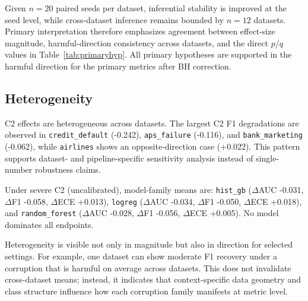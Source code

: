 \documentclass{AuthorGuide/ijitcs}
\newcommand{\fittableinput}[1]{%
\begingroup
\setlength{\tabcolsep}{4pt}%
\resizebox{\textwidth}{!}{}%
\endgroup
}
\begin{document}
Given $n=20$ paired seeds per dataset, inferential stability is improved at the seed level, while cross-dataset inference remains bounded by $n=12$ datasets. Primary interpretation therefore emphasizes agreement between effect-size magnitude, harmful-direction consistency across datasets, and the direct $p$/$q$ values in Table~\ref{tab:primaryhyp}. All primary hypotheses are supported in the harmful direction for the primary metrics after BH correction.

\begin{table}[!t]
\caption{Direct predefined-hypothesis inference table (\texttt{../results/tables/table\_primary\_hypothesis\_tests.csv}). Each row is one predefined primary hypothesis (C2/C2+C4 $\times$ AUC/F1/ECE). Deltas are dataset-level severe-minus-baseline effects; two-sided one-sample $t$ and Wilcoxon tests are reported with BH correction across the six tests. Harmful direction is $\Delta$AUC/$\Delta$F1 $< 0$ and $\Delta$ECE $> 0$; inference is dataset-cluster-aware by construction.\label{tab:primaryhyp}}
\scriptsize
\fittableinput{../results/tables/table_primary_hypothesis_tests.tex}
\end{table}


\subsection{Heterogeneity}
C2 effects are heterogeneous across datasets. The largest C2 F1 degradations are observed in \texttt{credit\_default} (-0.242), \texttt{aps\_failure} (-0.116), and \texttt{bank\_marketing} (-0.062), while \texttt{airlines} shows an opposite-direction case (+0.022). This pattern supports dataset- and pipeline-specific sensitivity analysis instead of single-number robustness claims.

Under severe C2 (uncalibrated), model-family means are: \texttt{hist\_gb} ($\Delta$AUC -0.031, $\Delta$F1 -0.058, $\Delta$ECE +0.013), \texttt{logreg} ($\Delta$AUC -0.034, $\Delta$F1 -0.050, $\Delta$ECE +0.018), and \texttt{random\_forest} ($\Delta$AUC -0.028, $\Delta$F1 -0.056, $\Delta$ECE +0.005). No model dominates all endpoints.

Heterogeneity is visible not only in magnitude but also in direction for selected settings. For example, one dataset can show moderate F1 recovery under a corruption that is harmful on average across datasets. This does not invalidate cross-dataset means; instead, it indicates that context-specific data geometry and class structure influence how each corruption family manifests at metric level.
\end{document}
